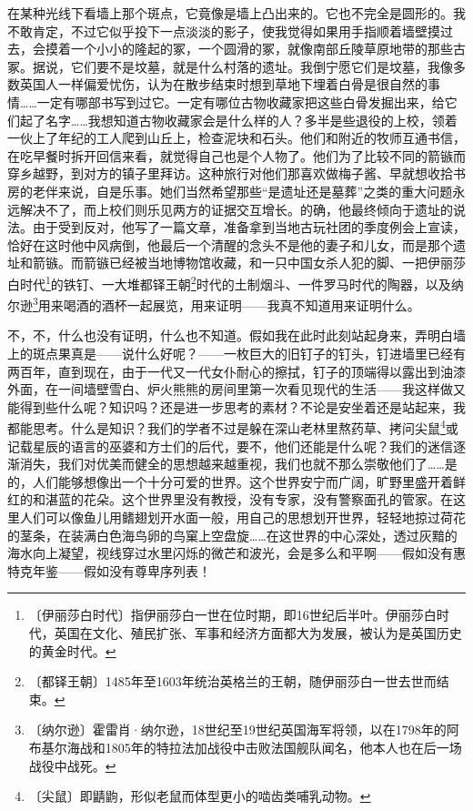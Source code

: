 \documentclass[12pt,UTF-8,openany]{ctexbook}
\begin{document}
\begin{normalsize}
    在某种光线下看墙上那个斑点，它竟像是墙上凸出来的。它也不完全是圆形的。我不敢肯定，不过它似乎投下一点淡淡的影子，使我觉得如果用手指顺着墙壁摸过去，会摸着一个小小的隆起的冢，一个圆滑的冢，就像南部丘陵草原地带的那些古冢。据说，它们要不是坟墓，就是什么村落的遗址。我倒宁愿它们是坟墓，我像多数英国人一样偏爱忧伤，认为在散步结束时想到草地下埋着白骨是很自然的事情……一定有哪部书写到过它。一定有哪位古物收藏家把这些白骨发掘出来，给它们起了名字……我想知道古物收藏家会是什么样的人？多半是些退役的上校，领着一伙上了年纪的工人爬到山丘上，检查泥块和石头。他们和附近的牧师互通书信，在吃早餐时拆开回信来看，就觉得自己也是个人物了。他们为了比较不同的箭镞而穿乡越野，到对方的镇子里拜访。这种旅行对他们那喜欢做梅子酱、早就想收拾书房的老伴来说，自是乐事。她们当然希望那些“是遗址还是墓葬”之类的重大问题永远解决不了，而上校们则乐见两方的证据交互增长。的确，他最终倾向于遗址的说法。由于受到反对，他写了一篇文章，准备拿到当地古玩社团的季度例会上宣读，恰好在这时他中风病倒，他最后一个清醒的念头不是他的妻子和儿女，而是那个遗址和箭镞。而箭镞已经被当地博物馆收藏，和一只中国女杀人犯的脚、一把伊丽莎白时代\footnote{〔伊丽莎白时代〕指伊丽莎白一世在位时期，即16世纪后半叶。伊丽莎白时代，英国在文化、殖民扩张、军事和经济方面都大为发展，被认为是英国历史的黄金时代。}的铁钉、一大堆都铎王朝\footnote{〔都铎王朝〕1485年至1603年统治英格兰的王朝，随伊丽莎白一世去世而结束。}时代的土制烟斗、一件罗马时代的陶器，以及纳尔逊\footnote{〔纳尔逊〕霍雷肖·纳尔逊，18世纪至19世纪英国海军将领，以在1798年的阿布基尔海战和1805年的特拉法加战役中击败法国舰队闻名，他本人也在后一场战役中战死。}用来喝酒的酒杯一起展览，用来证明——我真不知道用来证明什么。
    
    不，不，什么也没有证明，什么也不知道。假如我在此时此刻站起身来，弄明白墙上的斑点果真是——说什么好呢？——一枚巨大的旧钉子的钉头，钉进墙里已经有两百年，直到现在，由于一代又一代女仆耐心的擦拭，钉子的顶端得以露出到油漆外面，在一间墙壁雪白、炉火熊熊的房间里第一次看见现代的生活——我这样做又能得到些什么呢？知识吗？还是进一步思考的素材？不论是安坐着还是站起来，我都能思考。什么是知识？我们的学者不过是躲在深山老林里熬药草、拷问尖鼠\footnote{〔尖鼠〕即鼱鼩，形似老鼠而体型更小的啮齿类哺乳动物。}或记载星辰的语言的巫婆和方士们的后代，要不，他们还能是什么呢？我们的迷信逐渐消失，我们对优美而健全的思想越来越重视，我们也就不那么崇敬他们了……是的，人们能够想像出一个十分可爱的世界。这个世界安宁而广阔，旷野里盛开着鲜红的和湛蓝的花朵。这个世界里没有教授，没有专家，没有警察面孔的管家。在这里人们可以像鱼儿用鳍翅划开水面一般，用自己的思想划开世界，轻轻地掠过荷花的茎条，在装满白色海鸟卵的鸟窠上空盘旋……在这世界的中心深处，透过灰黯的海水向上凝望，视线穿过水里闪烁的微芒和波光，会是多么和平啊——假如没有惠特克年鉴——假如没有尊卑序列表！
    

\end{normalsize}
\end{document}
